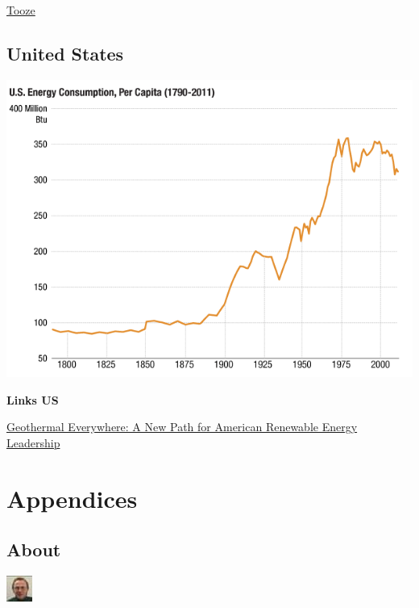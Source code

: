 \documentclass[
]{book}
\begin{document}
\href{https://adamtooze.substack.com/p/serbian-lithium-mother-courage-and}{Tooze}

\hypertarget{united-states}{%
\chapter{United States}\label{united-states}}

\includegraphics{fig/us_energy_consumption_pc_1790-2011.png}

\textbf{Links US}

\href{https://innovationfrontier.org/geothermal-everywhere-a-new-path-for-american-renewable-energy-leadership/}{Geothermal Everywhere: A New Path for American Renewable Energy Leadership}

\hypertarget{part-appendices}{%
\part{Appendices}\label{part-appendices}}

\hypertarget{appendix-appendices}{%
\appendix}


\hypertarget{about}{%
\chapter{About}\label{about}}

\includegraphics{fig/me.jpg}
\end{document}
